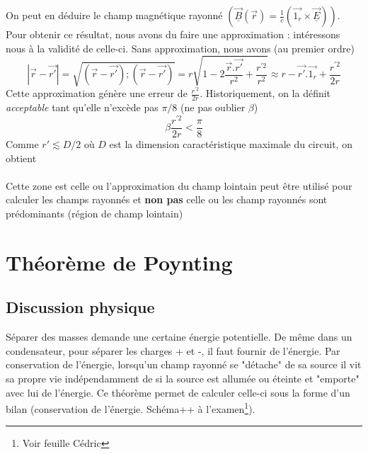 	On peut en déduire le champ magnétique rayonné $\left(\underline{\vec{B}}(\vec{r}) = 
	\frac{1}{c}\left(\vec{1_r}\times\underline{\vec{E}}\right)\right)$. Pour obtenir ce résultat, 
	nous avons du faire une approximation : intéressons nous à la validité de celle-ci. Sans 
	approximation, nous avons (au premier ordre)
	\begin{equation}
	|\vec{r}-\vec{r'}| = \sqrt{(\vec{r}-\vec{r'});(\vec{r}-\vec{r'})} = r\sqrt{1-2\frac{\vec{r}.
	\vec{r'}}{r^2}+\frac{r^{'2}}{r^2}} \approx r-\vec{r'}.\vec{1_r}+\frac{r^{'2}}{2r}
	\end{equation}
	Cette approximation génère une erreur de $\frac{r^{'2}}{2r}$. Historiquement, on la définit 
	\textit{acceptable} tant qu'elle n'excède pas $\pi/8$ (\danger ne pas oublier $\beta$)
	\begin{equation}
	\beta\frac{r^{'2}}{2r} < \frac{\pi}{8}
	\end{equation}
	Comme $r'\lesssim D/2$ où $D$ est la dimension caractéristique maximale du circuit, on obtient\\
	\ \\
	
	\danger Cette zone est celle ou l'approximation du champ lointain peut être utilisé pour 
	calculer les champs rayonnés et \textbf{non pas} celle ou les champ rayonnés sont prédominants 
	(région de champ lointain)
	
\section{Théorème de Poynting}
	\subsection{Discussion physique}
Séparer des masses demande une certaine énergie potentielle. De même dans un condensateur, pour 
séparer les charges + et -, il faut fournir de l'énergie. Par conservation de l'énergie, lorsqu'un 
champ rayonné se "détache" de sa source il vit sa propre vie indépendamment de si la source est 
allumée ou éteinte et "emporte" avec lui de l'énergie. Ce théorème permet de calculer celle-ci sous 
la forme d'un bilan (conservation de l'énergie. Schéma++ à l'examen\footnote{Voir feuille Cédric}).\\

